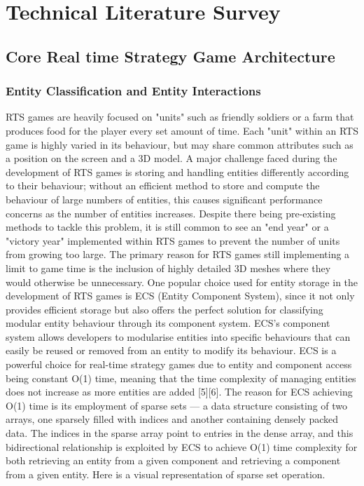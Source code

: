 \documentclass[]{final_report}
\begin{document}
\newpage
\chapter{Technical Literature Survey}
\section{Core Real time Strategy Game Architecture}
\subsection{Entity Classification and Entity Interactions}
RTS games are heavily focused on "units" such as friendly soldiers or a farm that produces food for the player every set amount of time. Each "unit" within an RTS game is highly varied in its behaviour, but may share common attributes such as a position on the screen and a 3D model. \newline
A major challenge faced during the development of RTS games is storing and handling entities differently according to their behaviour; without an efficient method to store and compute the behaviour of large numbers of entities, this causes significant performance concerns as the number of entities increases. Despite there being pre-existing methods to tackle this problem, it is still common to see an "end year" or a "victory year" implemented within RTS games to prevent the number of units from growing too large. The primary reason for RTS games still implementing a limit to game time is the inclusion of highly detailed 3D meshes where they would otherwise be unnecessary. \newline
One popular choice used for entity storage in the development of RTS games is ECS (Entity Component System), since it not only provides efficient storage but also offers the perfect solution for classifying modular entity behaviour through its component system. ECS's component system allows developers to modularise entities into specific behaviours that can easily be reused or removed from an entity to modify its behaviour. \newline
ECS is a powerful choice for real-time strategy games due to entity and component access being constant O(1) time, meaning that the time complexity of managing entities does not increase as more entities are added [5][6]. The reason for ECS achieving O(1) time is its employment of sparse sets --- a data structure consisting of two arrays, one sparsely filled with indices and another containing densely packed data. The indices in the sparse array point to entries in the dense array, and this bidirectional relationship is exploited by ECS to achieve O(1) time complexity for both retrieving an entity from a given component and retrieving a component from a given entity. Here is a visual representation of sparse set operation. \newline
\end{document}
